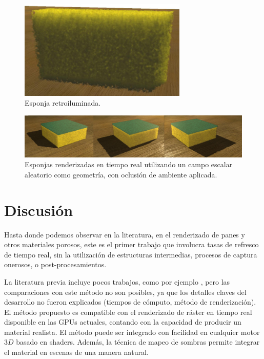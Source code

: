 \begin{figure}[htb!]
  \centerline{\includegraphics[width=8cm]{fig7}}
  \caption{Esponja retroiluminada.}
  \label{fg:fig7}
\end{figure}


\begin{figure}
  \centerline{\includegraphics[width=13cm]{figures/sponges}}
  \caption{Esponjas renderizadas en tiempo real utilizando un campo escalar aleatorio como geometría, con oclusión de ambiente aplicada.}
  \label{fg:sponges}
\end{figure}

\section{Discusión}


Hasta donde podemos observar en la literatura, en el renderizado de panes y otros materiales porosos, este es el primer trabajo que involucra tasas de refresco de tiempo real, sin la utilización de estructuras intermedias, procesos de captura onerosos, o post-procesamientos.

La literatura previa incluye pocos trabajos, como por ejemplo \cite{Cho2007}, pero las comparaciones con este método no son posibles, ya que los detalles claves del desarrollo no fueron explicados (tiempos de cómputo, método de renderización).
El método propuesto es compatible con el renderizado de ráster en tiempo real disponible en las GPUs actuales, contando con la capacidad de producir un material realista.
El método puede ser integrado con facilidad en cualquier motor $3D$ basado en shaders.
Además, la técnica de mapeo de sombras permite integrar el material en escenas de una manera natural.

